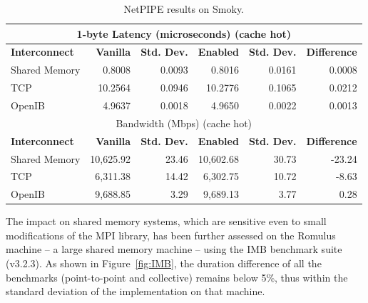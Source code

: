 \begin{table}\vspace{-.4cm}
\begin{center}\sf\scriptsize
\begin{tabular}{|l||r|r||r|r||r|}
\multicolumn{6}{c}{1-byte Latency (microseconds) (cache hot)} \\
\hline
\cellcolor[gray]{0.7}\textbf{Interconnect}  & \cellcolor[gray]{0.7}\textbf{Vanilla}   & \cellcolor[gray]{0.7}\textbf{Std. Dev.} &
\cellcolor[gray]{0.7}\textbf{Enabled}         & \cellcolor[gray]{0.7}\textbf{Std. Dev.} & \cellcolor[gray]{0.7}\textbf{Difference} \\
\hline
\cellcolor[gray]{0.9}Shared Memory &  0.8008 & 0.0093 &  0.8016 & 0.0161 &  0.0008 \\
\cellcolor[gray]{0.9}TCP           & 10.2564 & 0.0946 & 10.2776 & 0.1065 &  0.0212 \\
\cellcolor[gray]{0.9}OpenIB        &  4.9637 & 0.0018 &  4.9650 & 0.0022 &  0.0013 \\
\hline
\multicolumn{6}{c}{Bandwidth (Mbps) (cache hot)} \\
\hline
\cellcolor[gray]{0.7}\textbf{Interconnect}  & \cellcolor[gray]{0.7}\textbf{Vanilla}   & \cellcolor[gray]{0.7}\textbf{Std. Dev.} &
\cellcolor[gray]{0.7}\textbf{Enabled}         & \cellcolor[gray]{0.7}\textbf{Std. Dev.} & \cellcolor[gray]{0.7}\textbf{Difference} \\
\hline
\cellcolor[gray]{0.9}Shared Memory &  10,625.92 &  23.46 &  10,602.68 & 30.73 & -23.24 \\
\cellcolor[gray]{0.9}TCP           &   6,311.38 &  14.42 &   6,302.75 & 10.72 &  -8.63 \\
\cellcolor[gray]{0.9}OpenIB        &   9,688.85 &   3.29 &   9,689.13 &  3.77 &   0.28 \\
\hline
\end{tabular}
\end{center}
\caption{NetPIPE results on Smoky.\label{tab:netpipe}}\vspace{-.8cm}
\end{table}

The impact on shared memory systems, which are sensitive even to small
modifications of the MPI library, has been further assessed on the
Romulus machine -- a large shared memory machine -- using the IMB
benchmark suite (v3.2.3). As shown in Figure~\ref{fig:IMB}, the duration
difference of all the benchmarks (point-to-point and collective) remains
below 5\%, thus within the standard deviation of the implementation on
that machine.

